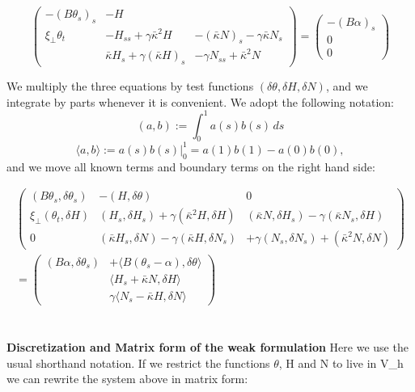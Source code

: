 \[\begin{pmatrix}
-(B\theta_s)_s & -H &  \\
\xi_\perp\theta_t & 
- H_{ss} + \gamma \bar \kappa^2H &
- (\bar\kappa N)_s - \gamma\bar\kappa N_s \\
 & 
\bar \kappa H_s +\gamma(\bar \kappa H)_s &
 - \gamma N_{ss} + \bar \kappa^2 N
\end{pmatrix}
%
=
\begin{pmatrix}
-(B\alpha)_s\\
0\\
0
\end{pmatrix}\]

We multiply the three equations by test functions
$(\delta \theta, \delta H, \delta N)$, and we integrate by parts
whenever it is convenient. We adopt the following notation:
\[
(a,b) := \int_0^1 a(s) b(s) \,d s
\]
\[
\langle a,b \rangle := a(s) b(s) \big|^1_0 = a(1)b(1)-a(0)b(0),
\]
and we move all known terms and boundary terms on the right hand side:

\begin{multline}
\begin{pmatrix}
(B\theta_s, \delta \theta_s)  &  -(H,\delta\theta)  & 0 \\
\xi_\perp(\theta_t, \delta H) & 
(H_{s}, \delta H_s) 
+ \gamma (\bar \kappa^2 H, \delta H ) &
 (\bar\kappa N, \delta H_s) 
- \gamma(\bar\kappa N_s, \delta H) \\
0 & 
(\bar \kappa H_s, \delta N) 
-\gamma(\bar \kappa H, \delta N_s) &
%
%
+ \gamma(N_{s},\delta N_s) 
+ (\bar \kappa^2 N, \delta N)
\end{pmatrix}
%
\\
=
\begin{pmatrix}
(B\alpha, \delta \theta_s)& +\langle B(\theta_s-\alpha), \delta \theta\rangle\\
& \langle H_s+\bar\kappa N,\delta H\rangle
\\
&\gamma\langle N_{s}-\bar \kappa H, \delta N \rangle 
\end{pmatrix}
\end{multline}
\\\\
\textbf{Discretization and Matrix form of the weak formulation}
Here we use the usual shorthand notation. If we restrict the functions $\theta$, H and N to live in V_h we can rewrite the system above in matrix form:

